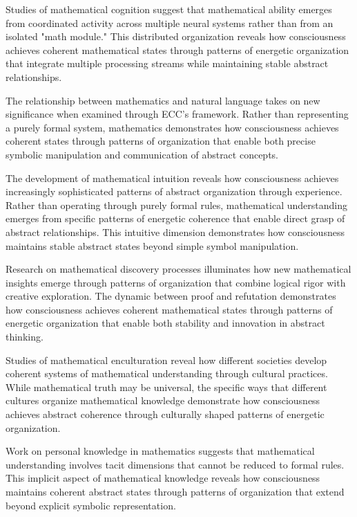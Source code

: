 \begin{refsection}
Studies of mathematical cognition \cite{Devlin2000} suggest that mathematical ability emerges from coordinated activity across multiple neural systems rather than from an isolated "math module." This distributed organization reveals how consciousness achieves coherent mathematical states through patterns of energetic organization that integrate multiple processing streams while maintaining stable abstract relationships.

The relationship between mathematics and natural language \cite{MacLane1986} takes on new significance when examined through ECC's framework. Rather than representing a purely formal system, mathematics demonstrates how consciousness achieves coherent states through patterns of organization that enable both precise symbolic manipulation and communication of abstract concepts.

The development of mathematical intuition \cite{Penrose1994} reveals how consciousness achieves increasingly sophisticated patterns of abstract organization through experience. Rather than operating through purely formal rules, mathematical understanding emerges from specific patterns of energetic coherence that enable direct grasp of abstract relationships. This intuitive dimension demonstrates how consciousness maintains stable abstract states beyond simple symbol manipulation.

Research on mathematical discovery processes \cite{Lakatos1976} illuminates how new mathematical insights emerge through patterns of organization that combine logical rigor with creative exploration. The dynamic between proof and refutation demonstrates how consciousness achieves coherent mathematical states through patterns of energetic organization that enable both stability and innovation in abstract thinking.

Studies of mathematical enculturation \cite{Lloyd1990} reveal how different societies develop coherent systems of mathematical understanding through cultural practices. While mathematical truth may be universal, the specific ways that different cultures organize mathematical knowledge demonstrate how consciousness achieves abstract coherence through culturally shaped patterns of energetic organization.

Work on personal knowledge in mathematics \cite{Polanyi1958} suggests that mathematical understanding involves tacit dimensions that cannot be reduced to formal rules. This implicit aspect of mathematical knowledge reveals how consciousness maintains coherent abstract states through patterns of organization that extend beyond explicit symbolic representation.


\end{refsection}
